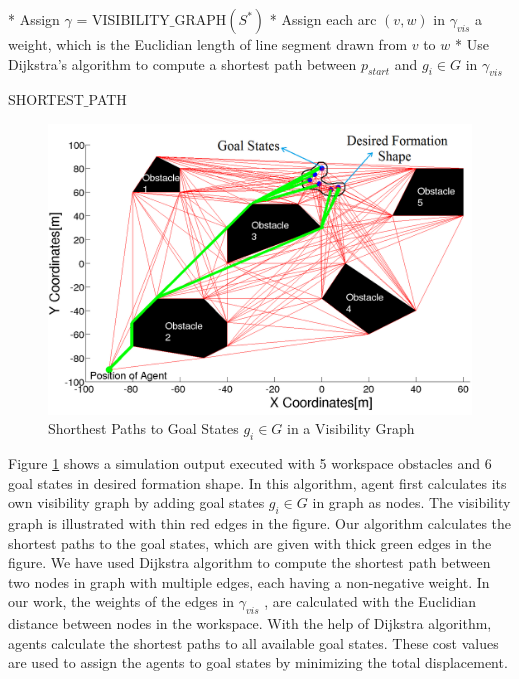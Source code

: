 \documentclass[letterpaper, 10 pt, conference]{ieeeconf}  %
\begin{document}
\begin{algorithm}
* Assign $\gamma$ = VISIBILITY$\_$GRAPH$(S^*)$ \newline
* Assign each arc $(v,w)$ in $\gamma_{vis}$ a weight, which is the Euclidian length of line segment drawn from $v$ to $w$ \newline
{}
{
* Use Dijkstra's algorithm to compute a shortest path between $p_{start}$ and $g_i \in G$ in $\gamma_{vis}$
}
\caption{SHORTEST$\_$PATH}
\end{algorithm}
  
\begin{figure}[thpb]
\centering
\includegraphics[scale = 0.22]{visgraph_yedek}
\caption{Shorthest Paths to Goal States $g_i \in G$ in a Visibility Graph} \label{dijksttae_visibility}
\end{figure}

Figure \ref{dijksttae_visibility} shows a simulation output executed with 5 workspace obstacles and 6 goal states in desired formation shape. In this algorithm, agent first calculates its own visibility graph by adding goal states $g_i \in G$ in graph as nodes. The visibility graph is illustrated with thin red edges in the figure. Our algorithm calculates the shortest paths to the goal states, which are given with thick green edges in the figure. We have used Dijkstra algorithm to compute the shortest path between two nodes in graph with multiple edges, each having a non-negative weight. In our work, the weights of the edges in $\gamma_{vis}$ , are calculated with the Euclidian distance between nodes in the workspace. With the help of Dijkstra algorithm, agents calculate the shortest paths to all available goal states. These cost values are used to assign the agents to goal states by minimizing the total displacement.  
\end{document}
